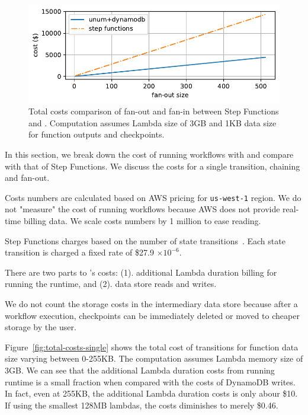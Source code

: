 \begin{figure}[t!]
    \centering
    \includegraphics[width=\columnwidth]{figures/TotalMapCost.pdf}
    \caption{Total costs comparison of fan-out and fan-in between Step
    Functions and \name{}. Computation assumes Lambda size of 3GB and 1KB data
    size for function outputs and checkpoints.}
    \label{fig:total-costs-map}
\end{figure}



In this section, we break down the cost of running workflows with \name{} and
compare with that of Step Functions. We discuss the costs for a single transition,
chaining and fan-out.

Costs numbers are calculated based on AWS pricing for \texttt{us-west-1}
region. We do not "measure" the cost of running workflows because AWS does not
provide real-time billing data. We scale costs numbers by 1 million to ease
reading.

Step Functions charges based on the number of state
transitions~\cite{aws-step-functions-pricing}. Each state transition is charged
a fixed rate of \$27.9 $ \times 10^{-6}$.

There are two parts to \name{}'s costs: (1). additional Lambda duration
billing for running the \name{} runtime, and (2). data store reads and writes.

We do not count the storage costs in the intermediary data store because after
a workflow execution, checkpoints can be immediately deleted or moved to
cheaper storage by the user.

Figure~\ref{fig:total-costs-single} shows the total cost of transitions for
function data size varying between 0-255KB. The computation assumes Lambda
memory size of 3GB. We can see that the additional Lambda duration costs from
running \name{} runtime is a small fraction when compared with the costs of
DynamoDB writes. In fact, even at 255KB, the additional Lambda
duration costs is only abour \$10. If using the smallest 128MB lambdas, the
costs diminishes to merely \$0.46.

